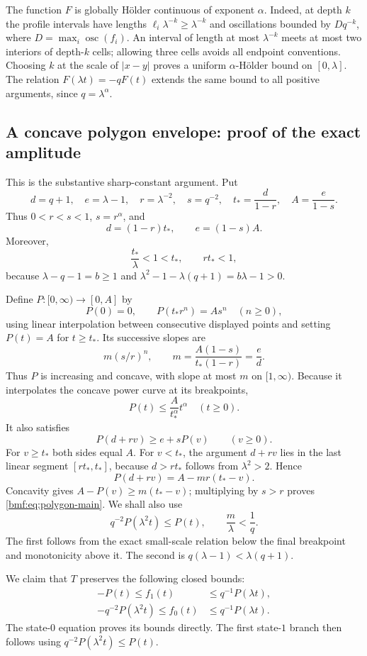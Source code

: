 \documentclass[11pt]{article}
\numberwithin{equation}{section}
\theoremstyle{definition}
\theoremstyle{remark}
\begin{document}
The function $F$ is globally H\"older continuous of exponent $\alpha$.
Indeed, at depth $k$ the profile intervals have lengths
$\ell_i\lambda^{-k}\geq\lambda^{-k}$ and oscillations bounded by
$Dq^{-k}$, where $D=\max_i\operatorname{osc}(f_i)$. An interval of length
at most $\lambda^{-k}$ meets at most two interiors of depth-$k$ cells;
allowing three cells avoids all endpoint conventions. Choosing $k$ at the
scale of $|x-y|$ proves a uniform $\alpha$-H\"older bound on $[0,\lambda]$.
The relation $F(\lambda t)=-qF(t)$ extends the same bound to all positive
arguments, since $q=\lambda^\alpha$.

\subsection{A concave polygon envelope: proof of the exact amplitude}

This is the substantive sharp-constant argument. Put
\[
 d=q+1,\quad e=\lambda-1,\quad
 r=\lambda^{-2},\quad s=q^{-2},\quad
 t_* =\frac d{1-r},\quad A=\frac e{1-s}.
\]
Thus $0<r<s<1$, $s=r^\alpha$, and
\[
 d=(1-r)t_*,\qquad e=(1-s)A.
\]
Moreover,
\[
 \frac{t_*}{\lambda}<1<t_*,\qquad rt_*<1,
\]
because $\lambda-q-1=b\geq1$ and
$\lambda^2-1-\lambda(q+1)=b\lambda-1>0$.

Define $P:[0,\infty)\to[0,A]$ by
\[
 P(0)=0,\qquad P(t_*r^n)=As^n\quad(n\geq0),
\]
using linear interpolation between consecutive displayed points and setting
$P(t)=A$ for $t\geq t_*$. Its successive slopes are
\[
 m(s/r)^n,\qquad
 m=\frac{A(1-s)}{t_*(1-r)}=\frac ed.
\]
Thus $P$ is increasing and concave, with slope at most $m$ on $[1,\infty)$.
Because it interpolates the concave power curve at its breakpoints,
\[
 P(t)\leq \frac A{t_*^\alpha}t^\alpha\quad(t\geq0).
\]
It also satisfies
\begin{equation}\label{bmf:eq:polygon-main}
 P(d+rv)\geq e+sP(v)\qquad(v\geq0).
\end{equation}
For $v\geq t_*$ both sides equal $A$. For $v<t_*$, the argument
$d+rv$ lies in the last linear segment $[rt_*,t_*]$, because
$d>rt_*$ follows from $\lambda^2>2$. Hence
\[
 P(d+rv)=A-mr(t_*-v).
\]
Concavity gives $A-P(v)\geq m(t_*-v)$; multiplying by $s>r$ proves
\eqref{bmf:eq:polygon-main}. We shall also use
\[
 q^{-2}P(\lambda^2t)\leq P(t),\qquad
 \frac m\lambda<\frac1q.
\]
The first follows from the exact small-scale relation below the final
breakpoint and monotonicity above it. The second is
$q(\lambda-1)<\lambda(q+1)$.

We claim that $T$ preserves the following closed bounds:
\begin{align*}
 -P(t)\leq f_1(t)&\leq q^{-1}P(\lambda t),\\
 -q^{-2}P(\lambda^2t)\leq f_0(t)&\leq q^{-1}P(\lambda t).
\end{align*}
The state-$0$ equation proves its bounds directly. The first state-$1$
branch then follows using $q^{-2}P(\lambda^2t)\leq P(t)$.
\end{document}
